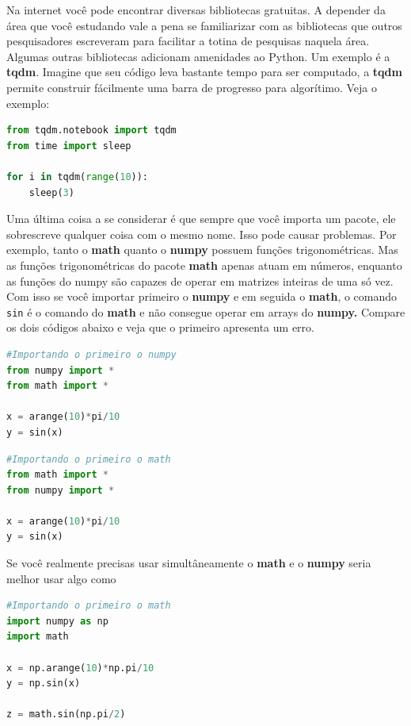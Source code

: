 Na internet você pode encontrar diversas bibliotecas gratuitas. A depender da área que você estudando vale a pena se familiarizar com as bibliotecas que outros pesquisadores escreveram para facilitar a totina de pesquisas naquela área. Algumas outras bibliotecas adicionam amenidades ao Python. Um exemplo é a {\bf tqdm}. Imagine que seu código leva bastante tempo para ser computado, a   {\bf tqdm} permite construir fácilmente uma barra de progresso para algorítimo. Veja o exemplo:

\begin{lstlisting}[language=Python]
from tqdm.notebook import tqdm
from time import sleep

for i in tqdm(range(10)):
    sleep(3)
\end{lstlisting}

Uma última coisa a se considerar é que sempre que você importa um pacote, ele sobrescreve qualquer coisa com o mesmo nome. Isso pode causar problemas. Por exemplo, tanto o {\bf math} quanto o {\bf numpy}
possuem funções trigonométricas. Mas as funções trigonométricas do pacote {\bf math} apenas atuam em números, enquanto as funções do numpy são capazes de operar em matrizes inteiras de uma só vez. Com isso se você importar primeiro o {\bf numpy} e em seguida o {\bf math}, o comando {\tt sin} é o comando do {\bf math} e não consegue operar em arrays do {\bf numpy.} Compare os dois códigos abaixo e veja que o primeiro apresenta um erro.

\begin{lstlisting}[language=Python]
#Importando o primeiro o numpy
from numpy import *
from math import *

x = arange(10)*pi/10
y = sin(x)
\end{lstlisting}

\begin{lstlisting}[language=Python]
#Importando o primeiro o math
from math import *
from numpy import *

x = arange(10)*pi/10
y = sin(x)
\end{lstlisting}

Se você realmente precisas usar simultâneamente o {\bf math} e o {\bf numpy} seria melhor usar algo como

\begin{lstlisting}[language=Python]
#Importando o primeiro o math
import numpy as np
import math

x = np.arange(10)*np.pi/10
y = np.sin(x)

z = math.sin(np.pi/2)
\end{lstlisting}

